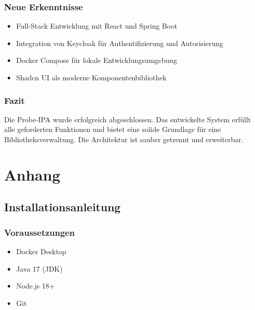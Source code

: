 \documentclass[a4paper,12pt,twoside]{report}
\begin{document}
\subsection{Neue Erkenntnisse}
\begin{itemize}
    \item Full-Stack Entwicklung mit React und Spring Boot
    \item Integration von Keycloak für Authentifizierung und Autorisierung
    \item Docker Compose für lokale Entwicklungsumgebung
    \item Shadcn UI als moderne Komponentenbibliothek
\end{itemize}

\subsection{Fazit}
Die Probe-IPA wurde erfolgreich abgeschlossen. Das entwickelte System erfüllt alle geforderten Funktionen und bietet eine solide Grundlage für eine Bibliotheksverwaltung. Die Architektur ist sauber getrennt und erweiterbar.

\newpage

\appendix
\chapter{Anhang}

\section{Installationsanleitung}

\subsection{Voraussetzungen}
\begin{itemize}
    \item Docker Desktop
    \item Java 17 (JDK)
    \item Node.js 18+
    \item Git
\end{itemize}
\end{document}
